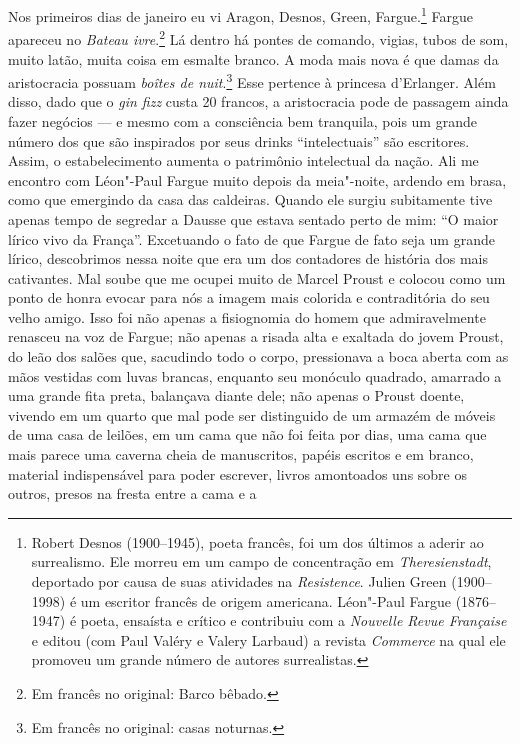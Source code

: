 Nos primeiros dias de janeiro eu vi Aragon,
Desnos, Green, Fargue.\footnote{Robert Desnos (1900--1945), poeta
  francês, foi um dos últimos a aderir ao surrealismo. Ele morreu em um
  campo de concentração em \emph{Theresienstadt}, deportado por causa de
  suas atividades na \emph{Resistence}. Julien Green (1900--1998) é um
  escritor francês de origem americana. Léon"-Paul Fargue (1876--1947) é
  poeta, ensaísta e crítico e contribuiu com a \emph{Nouvelle Revue
  Française} e editou (com Paul Valéry e Valery Larbaud) a revista
  \emph{Commerce} na qual ele promoveu um grande número de autores
  surrealistas. \versal{[N.~O.]}} Fargue apareceu no \emph{Bateau ivre}.\footnote{Em francês no original: Barco bêbado. \versal{[N.~T.]}} Lá dentro há
pontes de comando, vigias, tubos de som, muito latão, muita coisa em
esmalte branco. A moda mais nova é que damas da aristocracia possuam
\emph{boîtes de nuit}.\footnote{Em francês no original: casas noturnas. \versal{[N.~T.]}} Esse pertence à princesa d'Erlanger. Além disso, dado que
o \emph{gin fizz} custa 20 francos, a aristocracia pode de passagem
ainda fazer negócios --- e mesmo com a consciência bem tranquila, pois um
grande número dos que são inspirados por seus drinks ``intelectuais'' são escritores.
Assim, o estabelecimento aumenta o patrimônio intelectual da nação. Ali me
encontro com Léon"-Paul Fargue muito depois da meia"-noite, ardendo em
brasa, como que emergindo da casa das caldeiras. Quando ele surgiu
subitamente tive apenas tempo de segredar a Dausse que estava sentado
perto de mim: ``O maior lírico vivo da França''. Excetuando o fato de
que Fargue de fato seja um grande lírico, descobrimos nessa noite que
era um dos contadores de história dos mais cativantes. Mal soube que me
ocupei muito de Marcel Proust e colocou como um ponto de honra evocar
para nós a imagem mais colorida e contraditória do seu velho amigo. Isso
foi não apenas a fisiognomia do homem que admiravelmente renasceu na voz
de Fargue; não apenas a risada alta e exaltada do jovem Proust, do leão
dos salões que, sacudindo todo o corpo, pressionava a boca aberta com as
mãos vestidas com luvas brancas, enquanto seu monóculo quadrado,
amarrado a uma grande fita preta, balançava diante dele; não apenas o
Proust doente, vivendo em um quarto que mal pode ser distinguido de um
armazém de móveis de uma casa de leilões, em um cama que não foi feita
por dias, uma cama que mais parece uma caverna cheia de manuscritos,
papéis escritos e em branco, material indispensável para poder escrever,
livros amontoados uns sobre os outros, presos na fresta entre a cama e a
